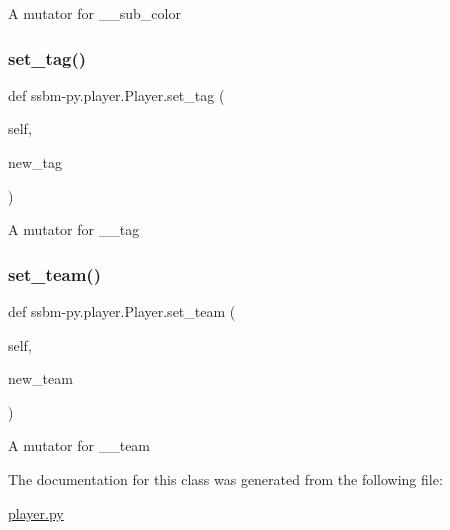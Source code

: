 \begin{DoxyVerb}A mutator for __sub_color \end{DoxyVerb}
 \mbox{\label{classssbm-py_1_1player_1_1_player_ab108135e28b39fd47eb28b698d8e7dca}} 
\subsubsection{\texorpdfstring{set\+\_\+tag()}{set\_tag()}}
{\footnotesize\ttfamily def ssbm-\/py.\+player.\+Player.\+set\+\_\+tag (\begin{DoxyParamCaption}\item[{}]{self,  }\item[{}]{new\+\_\+tag }\end{DoxyParamCaption})}

\begin{DoxyVerb}A mutator for __tag \end{DoxyVerb}
 \mbox{\label{classssbm-py_1_1player_1_1_player_a76ee5811187bdd2bf707aefa7fe8289f}} 
\subsubsection{\texorpdfstring{set\+\_\+team()}{set\_team()}}
{\footnotesize\ttfamily def ssbm-\/py.\+player.\+Player.\+set\+\_\+team (\begin{DoxyParamCaption}\item[{}]{self,  }\item[{}]{new\+\_\+team }\end{DoxyParamCaption})}

\begin{DoxyVerb}A mutator for __team \end{DoxyVerb}
 

The documentation for this class was generated from the following file\+:\begin{DoxyCompactItemize}
\item 
\hyperlink{player_8py}{player.\+py}\end{DoxyCompactItemize}
